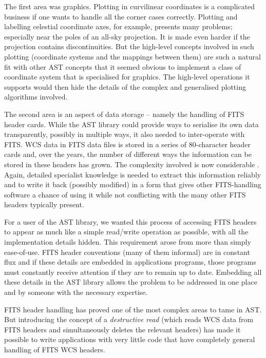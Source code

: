 \documentclass[final,authoryear,5p,times,twocolumn]{elsarticle}
\begin{document}
The first area was graphics. Plotting in curvilinear coordinates is a
complicated business if one wants to handle all the corner cases
correctly. Plotting and labelling celestial coordinate axes, for
example, presents many problems; especially near the poles of an all-sky
projection. It is made even harder if the projection contains
discontinuities. But the high-level concepts involved in such plotting
(coordinate systems and the mappings between them) are such a natural
fit with other AST concepts that it seemed obvious to implement a class
of coordinate system that is specialised for graphics. The high-level
operations it supports would then hide the details of the complex and
generalised plotting algorithms involved.

The second area is an aspect of data storage -- namely the handling of
FITS header cards. While the AST library could provide ways to
serialise its own data transparently, possibly in multiple ways, it
also needed to inter-operate with FITS. WCS data in FITS data files is
stored in a series of 80-character header cards and, over the years,
the number of different ways the information can be stored in these
headers has grown. The complexity involved is now considerable
\citep[see e.g.,][]{2015Thomas}. Again, detailed specialist knowledge
is needed to extract this information reliably and to write it back
(possibly modified) in a form that gives other FITS-handling software
a chance of using it while not conflicting with the many other FITS
headers typically present.

For a user of the AST library, we wanted this process of accessing FITS
headers to appear as much like a simple read/write operation as
possible, with all the implementation details hidden. This requirement
arose from more than simply ease-of-use. FITS header conventions (many
of them informal) are in constant flux and if these details are embedded
in applications programs, those programs must constantly receive
attention if they are to remain up to date. Embedding all these details
in the AST library allows the problem to be addressed in one place and
by someone with the necessary expertise.

FITS header handling has proved one of the most complex areas to tame in AST.
But introducing the concept of a \emph{destructive read} (which reads WCS
data from FITS headers and simultaneously deletes the relevant headers)
has made it possible to write applications with very little code that
have completely general handling of FITS WCS headers.
\end{document}
